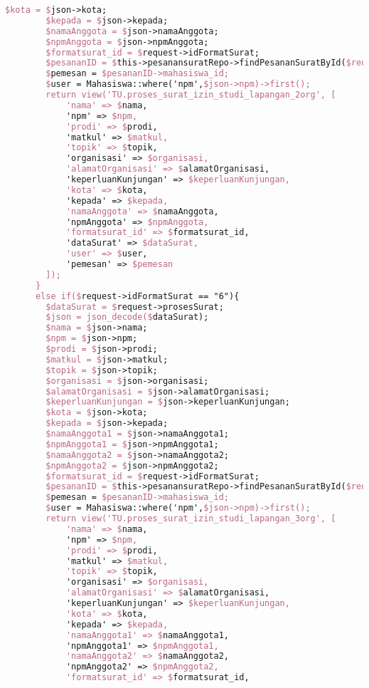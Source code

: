 \begin{lstlisting}[language=tex,basicstyle=\tiny,caption=PesanansuratController.php]
        $kota = $json->kota;
        $kepada = $json->kepada;
        $namaAnggota = $json->namaAnggota;
        $npmAnggota = $json->npmAnggota;
        $formatsurat_id = $request->idFormatSurat;
        $pesananID = $this->pesanansuratRepo->findPesananSuratById($request->id);
        $pemesan = $pesananID->mahasiswa_id;
        $user = Mahasiswa::where('npm',$json->npm)->first();
        return view('TU.proses_surat_izin_studi_lapangan_2org', [
            'nama' => $nama,
            'npm' => $npm,
            'prodi' => $prodi,
            'matkul' => $matkul,
            'topik' => $topik,
            'organisasi' => $organisasi,
            'alamatOrganisasi' => $alamatOrganisasi,
            'keperluanKunjungan' => $keperluanKunjungan,
            'kota' => $kota,
            'kepada' => $kepada,
            'namaAnggota' => $namaAnggota,
            'npmAnggota' => $npmAnggota,
            'formatsurat_id' => $formatsurat_id,
            'dataSurat' => $dataSurat,
            'user' => $user,
            'pemesan' => $pemesan
        ]);
      }
      else if($request->idFormatSurat == "6"){
        $dataSurat = $request->prosesSurat;
        $json = json_decode($dataSurat);
        $nama = $json->nama;
        $npm = $json->npm;
        $prodi = $json->prodi;
        $matkul = $json->matkul;
        $topik = $json->topik;
        $organisasi = $json->organisasi;
        $alamatOrganisasi = $json->alamatOrganisasi;
        $keperluanKunjungan = $json->keperluanKunjungan;
        $kota = $json->kota;
        $kepada = $json->kepada;
        $namaAnggota1 = $json->namaAnggota1;
        $npmAnggota1 = $json->npmAnggota1;
        $namaAnggota2 = $json->namaAnggota2;
        $npmAnggota2 = $json->npmAnggota2;
        $formatsurat_id = $request->idFormatSurat;
        $pesananID = $this->pesanansuratRepo->findPesananSuratById($request->id);
        $pemesan = $pesananID->mahasiswa_id;
        $user = Mahasiswa::where('npm',$json->npm)->first();
        return view('TU.proses_surat_izin_studi_lapangan_3org', [
            'nama' => $nama,
            'npm' => $npm,
            'prodi' => $prodi,
            'matkul' => $matkul,
            'topik' => $topik,
            'organisasi' => $organisasi,
            'alamatOrganisasi' => $alamatOrganisasi,
            'keperluanKunjungan' => $keperluanKunjungan,
            'kota' => $kota,
            'kepada' => $kepada,
            'namaAnggota1' => $namaAnggota1,
            'npmAnggota1' => $npmAnggota1,
            'namaAnggota2' => $namaAnggota2,
            'npmAnggota2' => $npmAnggota2,
            'formatsurat_id' => $formatsurat_id,

\end{lstlisting}
